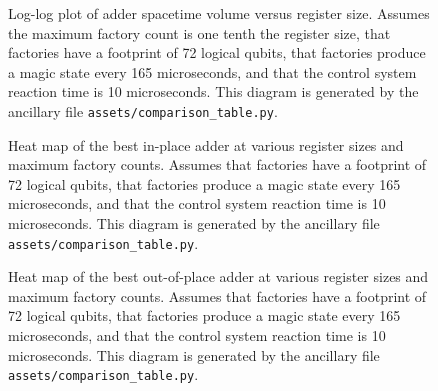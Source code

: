 \documentclass[onecolumn,unpublished]{quantumarticle}
\theoremstyle{definition}
\theoremstyle{definition}
\theoremstyle{definition}
\begin{document}
\begin{figure}
{    }
    \endminipage
    \caption{
        Log-log plot of adder spacetime volume versus register size. Assumes the maximum factory count is one tenth the register size, that factories have a footprint of 72 logical qubits, that factories produce a magic state every 165 microseconds, and that the control system reaction time is 10 microseconds.
        This diagram is generated by the ancillary file \texttt{assets/comparison\_table.py}.
    }
    \label{fig:my_label}
\end{figure}

\begin{figure}
    \centering
    \caption{
        Heat map of the best in-place adder at various register sizes and maximum factory counts.
        Assumes that factories have a footprint of 72 logical qubits, that factories produce a magic state every 165 microseconds, and that the control system reaction time is 10 microseconds.
        This diagram is generated by the ancillary file \texttt{assets/comparison\_table.py}.
    }
    \label{fig:my_label}
\end{figure}

\begin{figure}
    \centering
    \caption{
        Heat map of the best out-of-place adder at various register sizes and maximum factory counts.
        Assumes that factories have a footprint of 72 logical qubits, that factories produce a magic state every 165 microseconds, and that the control system reaction time is 10 microseconds.
        This diagram is generated by the ancillary file \texttt{assets/comparison\_table.py}.
    }
    \label{fig:my_label}
\end{figure}
\end{document}
